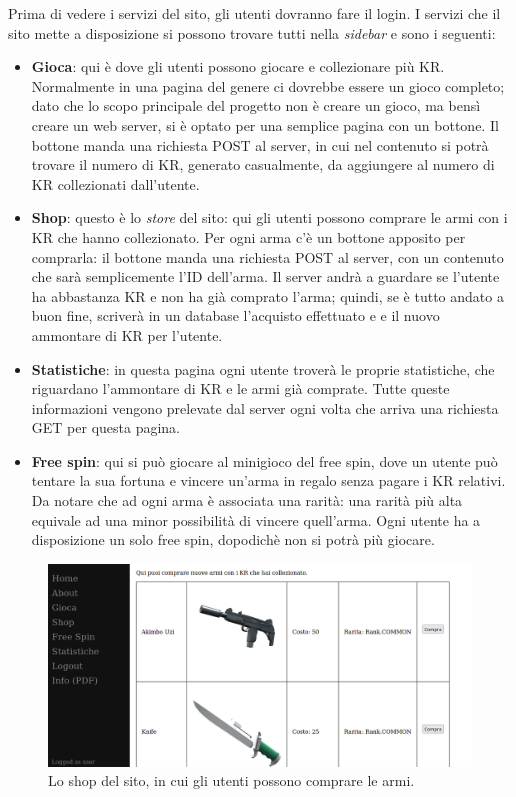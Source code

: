 \documentclass[a4paper,12pt]{report}
\begin{document}
Prima di vedere i servizi del sito, gli utenti dovranno fare il login. I servizi che il sito mette a disposizione si possono trovare tutti nella \textit{sidebar} e sono i seguenti:
\begin{itemize}
\item \textbf{Gioca}: qui è dove gli utenti possono giocare e collezionare più KR. Normalmente in una pagina del genere ci dovrebbe essere un gioco completo; dato che lo scopo principale del progetto non è creare un gioco, ma bensì creare un web server, si è optato per una semplice pagina con un bottone. Il bottone manda una richiesta POST al server, in cui nel contenuto si potrà trovare il numero di KR, generato casualmente, da aggiungere al numero di KR collezionati dall'utente.
\item \textbf{Shop}: questo è lo \textit{store} del sito: qui gli utenti possono comprare le armi con i KR che hanno collezionato. Per ogni arma c'è un bottone apposito per comprarla: il bottone manda una richiesta POST al server, con un contenuto che sarà semplicemente l'ID dell'arma. Il server andrà a guardare se l'utente ha abbastanza KR e non ha già comprato l'arma; quindi, se è tutto andato a buon fine, scriverà in un database l'acquisto effettuato e e il nuovo ammontare di KR per l'utente.
\item \textbf{Statistiche}: in questa pagina ogni utente troverà le proprie statistiche, che riguardano l'ammontare di KR e le armi già comprate. Tutte queste informazioni vengono prelevate dal server ogni volta che arriva una richiesta GET per questa pagina.
\item \textbf{Free spin}: qui si può giocare al minigioco del free spin, dove un utente può tentare la sua fortuna e vincere un'arma in regalo senza pagare i KR relativi. Da notare che ad ogni arma è associata una rarità: una rarità più alta equivale ad una minor possibilità di vincere quell'arma. Ogni utente ha a disposizione un solo free spin, dopodichè non si potrà più giocare.
\end{itemize}

\begin{figure}[h]
\centering{}
\includegraphics[width=\textwidth]{shop.png}
\caption{Lo shop del sito, in cui gli utenti possono comprare le armi.}
\label{img:home_user}
\end{figure}
\end{document}
